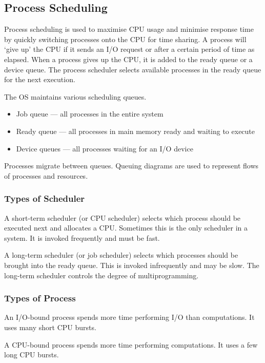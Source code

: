 \subsection{Process Scheduling}

Process scheduling is used to maximise CPU usage and minimise response time by quickly switching processes onto the CPU for time sharing.
A process will `give up' the CPU if it sends an I/O request or after a certain period of time as elapsed.
When a process gives up the CPU, it is added to the ready queue or a device queue.
The process scheduler selects available processes in the ready queue for the next execution.

The OS maintains various scheduling queues.
\begin{itemize}
  \item Job queue --- all processes in the entire system
  \item Ready queue --- all processes in main memory ready and waiting to execute
  \item Device queues --- all processes waiting for an I/O device
\end{itemize}

Processes migrate between queues.
Queuing diagrams are used to represent flows of processes and resources.

\subsubsection{Types of Scheduler}

A short-term scheduler (or CPU scheduler) selects which process should be executed next and allocates a CPU.
Sometimes this is the only scheduler in a system.
It is invoked frequently and must be fast.

A long-term scheduler (or job scheduler) selects which processes should be brought into the ready queue.
This is invoked infrequently and may be slow.
The long-term scheduler controls the degree of multiprogramming.

\subsubsection{Types of Process}

An I/O-bound process spends more time performing I/O than computations.
It uses many short CPU bursts.

A CPU-bound process spends more time performing computations.
It uses a few long CPU bursts.

